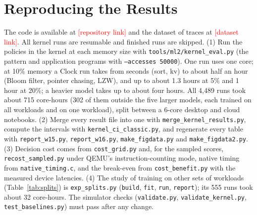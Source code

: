 \documentclass{article}
\newcommand{\clock}{Clock\xspace}
\begin{document}
\FloatBarrier
\section{Reproducing the Results}
\label{app:repro}

The code is available at \textcolor{red}{[repository link]} and the dataset of traces at \textcolor{red}{[dataset link]}. All kernel runs are resumable and finished runs are skipped. (1) Run the policies in the kernel at each memory size with \texttt{tools/ml2/kernel\_eval.py} (the pattern and application programs with \texttt{--accesses 50000}). One run uses one core; at 10\% memory a \clock run takes from seconds (sort, kv) to about half an hour (Bloom filter, pointer chasing, LZW), and up to about 1.3 hours at 5\% and 1 hour at 20\%; a heavier model takes up to about four hours. All 4,489 runs took about 715 core-hours (302 of them outside the five larger models, each trained on all workloads and on one workload), split between a 6-core desktop and cloud notebooks. (2) Merge every result file into one with \texttt{merge\_kernel\_results.py}, compute the intervals with \texttt{kernel\_ci\_classic.py}, and regenerate every table with \texttt{report\_w15.py}, \texttt{report\_w16.py}, \texttt{make\_figdata.py} and \texttt{make\_figdata2.py}. (3) Decision cost comes from \texttt{cost\_grid.py} and, for the sampled scores, \texttt{recost\_sampled.py} under QEMU's instruction-counting mode, native timing from \texttt{native\_timing.c}, and the break-even from \texttt{cost\_benefit.py} with the measured device latencies. (4) The study of training on other sets of workloads (Table~\ref{tab:splits}) is \texttt{exp\_splits.py} (\texttt{build}, \texttt{fit}, \texttt{run}, \texttt{report}); its 555 runs took about 32 core-hours. The simulator checks (\texttt{validate.py}, \texttt{validate\_kernel.py}, \texttt{test\_baselines.py}) must pass after any change.
\fi
\end{document}
